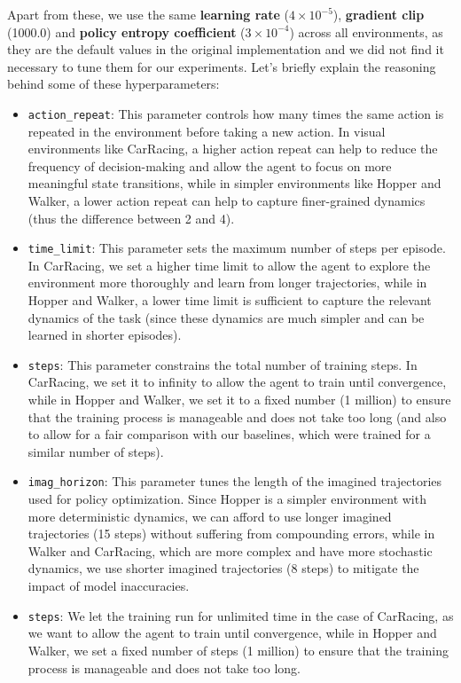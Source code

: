 \documentclass{article}
\begin{document}
Apart from these, we use the same \textbf{learning rate} ($4 \times 10^{-5}$), \textbf{gradient clip} (1000.0) and \textbf{policy entropy coefficient} ($3 \times 10^{-4}$) across all environments, as they are the default values in the original implementation and we did not find it necessary to tune them for our experiments. Let's briefly explain the reasoning behind some of these hyperparameters:
\begin{itemize}
    \item \texttt{action\_repeat}: This parameter controls how many times the same action is repeated in the environment before taking a new action. In visual environments like CarRacing, a higher action repeat can help to reduce the frequency of decision-making and allow the agent to focus on more meaningful state transitions, while in simpler environments like Hopper and Walker, a lower action repeat can help to capture finer-grained dynamics (thus the difference between 2 and 4).
    \item \texttt{time\_limit}: This parameter sets the maximum number of steps per episode. In CarRacing, we set a higher time limit to allow the agent to explore the environment more thoroughly and learn from longer trajectories, while in Hopper and Walker, a lower time limit is sufficient to capture the relevant dynamics of the task (since these dynamics are much simpler and can be learned in shorter episodes).
    \item \texttt{steps}: This parameter constrains the total number of training steps. In CarRacing, we set it to infinity to allow the agent to train until convergence, while in Hopper and Walker, we set it to a fixed number (1 million) to ensure that the training process is manageable and does not take too long (and also to allow for a fair comparison with our baselines, which were trained for a similar number of steps).
    \item \texttt{imag\_horizon}: This parameter tunes the length of the imagined trajectories used for policy optimization. Since Hopper is a simpler environment with more deterministic dynamics, we can afford to use longer imagined trajectories (15 steps) without suffering from compounding errors, while in Walker and CarRacing, which are more complex and have more stochastic dynamics, we use shorter imagined trajectories (8 steps) to mitigate the impact of model inaccuracies.
    \item \texttt{steps}: We let the training run for unlimited time in the case of CarRacing, as we want to allow the agent to train until convergence, while in Hopper and Walker, we set a fixed number of steps (1 million) to ensure that the training process is manageable and does not take too long.
\end{itemize}
\end{document}
